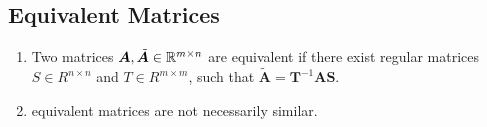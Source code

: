 \subsection{Equivalent Matrices}

\begin{enumerate}
    \item
    \begin{definition}
        Two matrices $\bm{A}, \tilde{\bm{A}} \in \mathbb{R}^{m\times n}$ are equivalent if there exist regular matrices $S \in R^{n\times n}$ and $T \in R^{m\times m}$, such that $\tilde{\bm{A}} = \bm{T} ^{-1}\bm{AS}$.
        \hfill \cite{mfml/book/mml/Deisenroth-Faisal-Ong}
    \end{definition}

    \item equivalent matrices are not necessarily similar.
    \hfill \cite{mfml/book/mml/Deisenroth-Faisal-Ong}
\end{enumerate}














